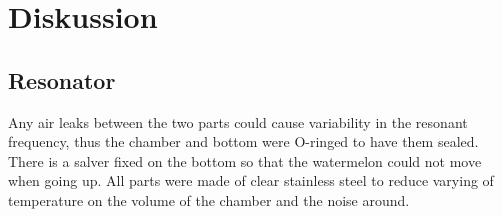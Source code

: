 \chapter{Diskussion}

\section{Resonator}
Any air leaks between the two parts could cause variability in
the resonant frequency, thus the chamber and bottom were O-ringed to have them sealed. There is a salver
fixed on the bottom so that the watermelon could not move when going up. All parts were made of clear
stainless steel to reduce varying of temperature on the volume of the chamber and the noise around.